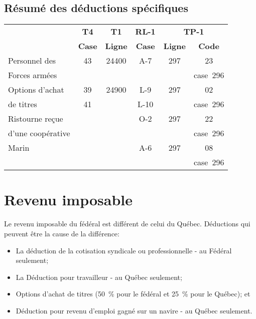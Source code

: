\subsection{Résumé des déductions spécifiques}
\begin{center}
	\begin{tabular}{|l|c|c|c|c|c|}
		\hline
		                  &  \textbf{T4}  &  \textbf{T1}   & \textbf{RL-1} & \multicolumn{2}{c|}{\textbf{TP-1}} \\ \cline{5-6}
		                  & \textbf{Case} & \textbf{Ligne} & \textbf{Case} & \textbf{Ligne} &   \textbf{Code}   \\ \hline
		Personnel des     &      43       &     24400      &      A-7      &      297       &        23         \\
		Forces armées     &               &                &               &                &     case~296      \\ \hline
		Options d'achat   &      39       &     24900      &      L-9      &      297       &        02         \\
		de titres         &      41       &                &     L-10      &                &     case~296      \\ \hline
		Ristourne reçue   &               &                &      O-2      &      297       &        22         \\
		d'une coopérative &               &                &               &                &     case~296      \\ \hline
		Marin             &               &                &      A-6      &      297       &        08         \\
		                  &               &                &               &                &     case~296      \\ \hline
	\end{tabular}
\end{center}




\section{Revenu imposable}
Le revenu imposable du fédéral est différent de celui du Québec. Déductions qui peuvent être la cause de la différence:

\begin{itemize}
	\item La déduction de la cotisation syndicale ou professionnelle - au Fédéral seulement;
	\item La \og Déduction pour travailleur \fg{} - au Québec seulement;
	\item Options d'achat de titres (50~\% pour le fédéral et 25~\% pour le Québec); et
	\item Déduction pour revenu d'emploi gagné sur un navire - au Québec seulement.
\end{itemize}



